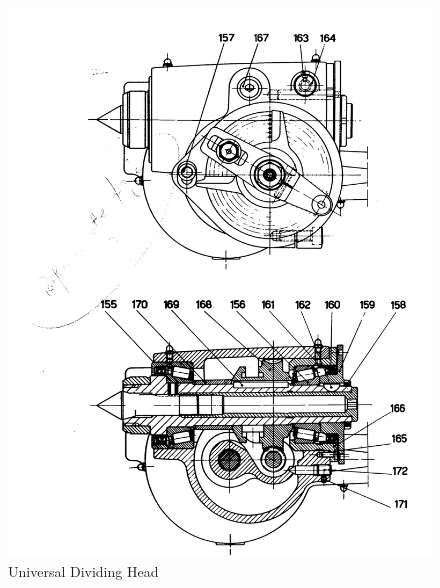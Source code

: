 \newpage
\begin{figure}[h]
    \centering
    \includegraphics[width=1.0\linewidth]{./images/page_51}
    \caption{Universal Dividing Head}
    \label{fig:universal_dividing_head}
\end{figure}
